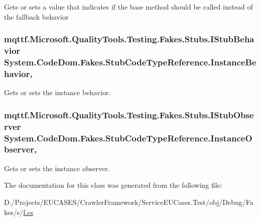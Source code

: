 Gets or sets a value that indicates if the base method should be called instead of the fallback behavior

\hypertarget{class_system_1_1_code_dom_1_1_fakes_1_1_stub_code_type_reference_ab5a79d71b79b09c30ee4df5ae434fdef}{
\subsubsection[{Instance\-Behavior}]{\setlength{\rightskip}{0pt plus 5cm}mqttf.\-Microsoft.\-Quality\-Tools.\-Testing.\-Fakes.\-Stubs.\-I\-Stub\-Behavior System.\-Code\-Dom.\-Fakes.\-Stub\-Code\-Type\-Reference.\-Instance\-Behavior\hspace{0.3cm}{\ttfamily [get]}, {\ttfamily [set]}}}\label{class_system_1_1_code_dom_1_1_fakes_1_1_stub_code_type_reference_ab5a79d71b79b09c30ee4df5ae434fdef}


Gets or sets the instance behavior.

\hypertarget{class_system_1_1_code_dom_1_1_fakes_1_1_stub_code_type_reference_a48255433d9c47467a8fbcfb77ae65b74}{
\subsubsection[{Instance\-Observer}]{\setlength{\rightskip}{0pt plus 5cm}mqttf.\-Microsoft.\-Quality\-Tools.\-Testing.\-Fakes.\-Stubs.\-I\-Stub\-Observer System.\-Code\-Dom.\-Fakes.\-Stub\-Code\-Type\-Reference.\-Instance\-Observer\hspace{0.3cm}{\ttfamily [get]}, {\ttfamily [set]}}}\label{class_system_1_1_code_dom_1_1_fakes_1_1_stub_code_type_reference_a48255433d9c47467a8fbcfb77ae65b74}


Gets or sets the instance observer.



The documentation for this class was generated from the following file\-:\begin{DoxyCompactItemize}
\item 
D\-:/\-Projects/\-E\-U\-C\-A\-S\-E\-S/\-Crawler\-Framework/\-Service\-E\-U\-Cases.\-Test/obj/\-Debug/\-Fakes/s/\hyperlink{s_2f_8cs}{f.\-cs}\end{DoxyCompactItemize}
